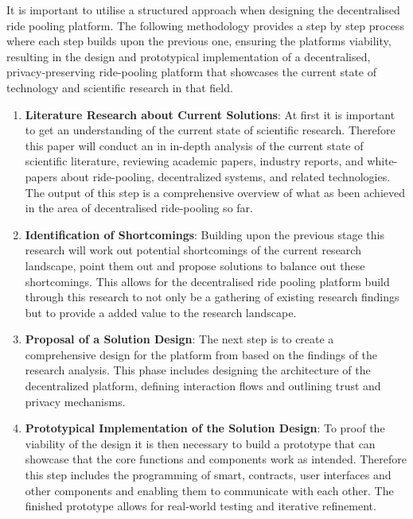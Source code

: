 It is important to utilise a structured approach when designing the decentralised ride pooling platform. The following methodology provides a step by step process where each step builds upon the previous one, ensuring the platforms viability, resulting in the design and prototypical implementation of a decentralised, privacy-preserving ride-pooling platform that showcases the current state of technology and scientific research in that field.


\begin{enumerate}

    \item \textbf{Literature Research about Current Solutions}: 
    At first it is important to get an understanding of the current state of scientific research. Therefore this paper will conduct an in in-depth analysis of the current state of scientific literature, reviewing academic papers, industry reports, and white-papers about ride-pooling, decentralized systems, and related technologies. The output of this step is a comprehensive overview of what as been achieved in the area of decentralised ride-pooling so far.

    \item \textbf{Identification of Shortcomings}: 
    Building upon the previous stage this research will work out potential shortcomings of the current research landscape, point them out and propose solutions to balance out these shortcomings. This allows for the decentralised ride pooling platform build through this research to not only be a gathering of existing research findings but to provide a added value to the research landscape.

    \item \textbf{Proposal of a Solution Design}:
    The next step is to create a comprehensive design for the platform from based on the findings of the research analysis. This phase includes designing the architecture of the decentralized platform, defining interaction flows and outlining trust and privacy mechanisms. 
    

    \item \textbf{Prototypical Implementation of the Solution Design}: 
    To proof the viability of the design it is then necessary to build a prototype that can showcase that the core functions and components work as intended. Therefore this step includes the programming of smart, contracts, user interfaces and other components and enabling them to communicate with each other. The finished prototype allows for real-world testing and iterative refinement.


\end{enumerate}
